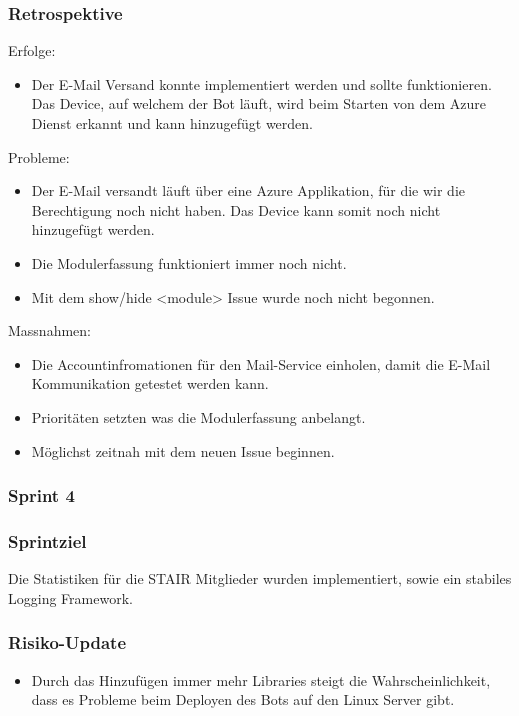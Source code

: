 \documentclass[a4paper, table]{article}
\begin{document}
\subsubsection*{Retrospektive}
Erfolge:
\begin{itemize}
    \item Der E-Mail Versand konnte implementiert werden und sollte funktionieren.
    Das Device, auf welchem der Bot läuft, wird beim Starten von dem Azure Dienst erkannt und kann hinzugefügt werden.
\end{itemize}
Probleme:
\begin{itemize}
    \item Der E-Mail versandt läuft über eine Azure Applikation, für die wir die Berechtigung noch nicht haben.
    Das Device kann somit noch nicht hinzugefügt werden.
    \item Die Modulerfassung funktioniert immer noch nicht.
    \item Mit dem show/hide <module> Issue wurde noch nicht begonnen.
\end{itemize}
Massnahmen:
\begin{itemize}
    \item Die Accountinfromationen für den Mail-Service einholen, damit die E-Mail Kommunikation getestet werden kann.
    \item Prioritäten setzten was die Modulerfassung anbelangt.
    \item Möglichst zeitnah mit dem neuen Issue beginnen.
\end{itemize}

\newpage
\subsubsection{Sprint 4}
\subsubsection*{Sprintziel}
Die Statistiken für die STAIR Mitglieder wurden implementiert, sowie ein stabiles Logging Framework.

\subsubsection*{Risiko-Update}
\begin{itemize}
    \item Durch das Hinzufügen immer mehr Libraries steigt die Wahrscheinlichkeit, dass es Probleme beim Deployen des Bots auf den Linux Server gibt.
\end{itemize}
\end{document}
